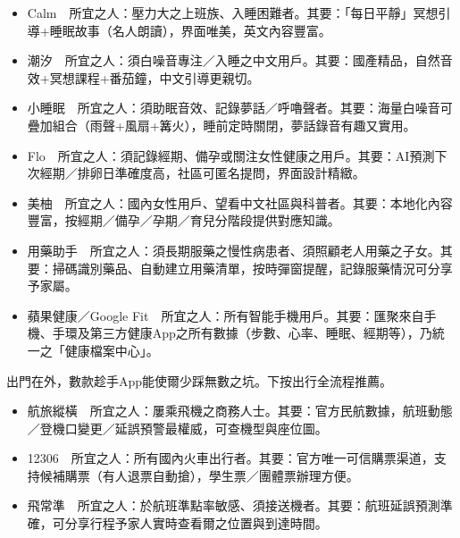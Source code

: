 
\begin{itemize}
  \item Calm　所宜之人：壓力大之上班族、入睡困難者。其要：「每日平靜」冥想引導+睡眠故事（名人朗讀），界面唯美，英文內容豐富。
  \item 潮汐　所宜之人：須白噪音專注／入睡之中文用戶。其要：國產精品，自然音效+冥想課程+番茄鐘，中文引導更親切。
  \item 小睡眠　所宜之人：須助眠音效、記錄夢話／呼嚕聲者。其要：海量白噪音可疊加組合（雨聲+風扇+篝火），睡前定時關閉，夢話錄音有趣又實用。
\end{itemize}


\begin{itemize}
  \item Flo　所宜之人：須記錄經期、備孕或關注女性健康之用戶。其要：AI預測下次經期／排卵日準確度高，社區可匿名提問，界面設計精緻。
  \item 美柚　所宜之人：國內女性用戶、望看中文社區與科普者。其要：本地化內容豐富，按經期／備孕／孕期／育兒分階段提供對應知識。
\end{itemize}


\begin{itemize}
  \item 用藥助手　所宜之人：須長期服藥之慢性病患者、須照顧老人用藥之子女。其要：掃碼識別藥品、自動建立用藥清單，按時彈窗提醒，記錄服藥情況可分享予家屬。
\end{itemize}


\begin{itemize}
  \item 蘋果健康／Google Fit　所宜之人：所有智能手機用戶。其要：匯聚來自手機、手環及第三方健康App之所有數據（步數、心率、睡眠、經期等），乃統一之「健康檔案中心」。
\end{itemize}


出門在外，數款趁手App能使爾少踩無數之坑。下按出行全流程推薦。


\begin{itemize}
  \item 航旅縱橫　所宜之人：屢乘飛機之商務人士。其要：官方民航數據，航班動態／登機口變更／延誤預警最權威，可查機型與座位圖。
  \item 12306　所宜之人：所有國內火車出行者。其要：官方唯一可信購票渠道，支持候補購票（有人退票自動搶），學生票／團體票辦理方便。
  \item 飛常準　所宜之人：於航班準點率敏感、須接送機者。其要：航班延誤預測準確，可分享行程予家人實時查看爾之位置與到達時間。
\end{itemize}

